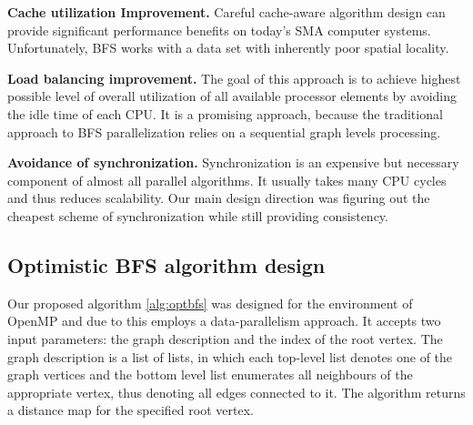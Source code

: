 \documentclass[letterpaper]{article}
\begin{document}
			\textbf{Cache utilization Improvement.}
			Careful cache-aware algorithm design can provide significant performance benefits on today's SMA computer systems.
			Unfortunately, BFS works with a data set with inherently poor spatial locality. 
			
			\textbf{Load balancing improvement.} 
			The goal of this approach is to achieve highest possible level of overall utilization of all available processor elements by avoiding the idle time of each CPU.
			It is a promising approach, because the traditional approach to BFS parallelization relies on a sequential graph levels processing.
						
			\textbf{Avoidance of synchronization.}
			Synchronization is an expensive but necessary component of almost all parallel algorithms.
			It usually takes many CPU cycles and thus reduces scalability.
			Our main design direction was figuring out the cheapest scheme of synchronization while still providing consistency.
			
			
		\subsection{Optimistic BFS algorithm design}
			Our proposed algorithm \ref{alg:optbfs} was designed for the environment of OpenMP and due to this employs a data-parallelism approach. 
			It accepts two input parameters: the graph description and the index of the root vertex.
			The graph description is a list of lists, in which each top-level list denotes one of the graph vertices and the bottom level list enumerates all neighbours of the appropriate vertex, thus denoting all edges connected to it.
			The algorithm returns a distance map for the specified root vertex.
			
\end{document}
